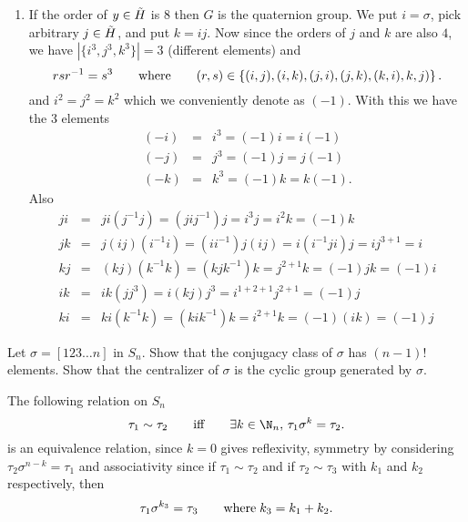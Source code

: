 \documentclass[12pt]{book}
\newcounter{myenumi}
\newenvironment{myenumerate}
{\begin{enumerate}
 \setcounter{enumi}{\themyenumi}
}
{\setcounter{myenumi}{\theenumi}
 \end{enumerate}}
\begin{document}
\begin{myenumerate}
\begin{enumerate}
\item If the order of \(y\in\tilde{H}\) is $8$ then $G$ is the quaternion group.
We put \(i=\sigma\), pick arbitrary \(j\in\tilde{H}\), and put \(k=ij\).
Now since the orders of $j$ and $k$ are also $4$,
we have \(|\{i^3,j^3,k^3\}|=3\) (different elements) and
\begin{equation*}
rsr^{-1}=s^3 \qquad \textnormal{where} \qquad
(r,s) \in \left\{(i,j), (i,k), (j,i), (j, k), (k,i), k,j)\right\}.
\end{equation*}
and \(i^2 = j^2 = k^2\) which we conveniently denote as \((-1)\).
With this we have the 3 elements
\begin{eqnarray*}
(-i) &=& i^{3} = (-1)i = i(-1) \\
(-j) &=& j^{3} = (-1)j = j(-1) \\
(-k) &=& k^{3} = (-1)k = k(-1).
\end{eqnarray*}
Also
\begin{eqnarray*}
ji &=& ji(j^{-1}j) = (jij^{-1})j = i^{3}j = i^2k = (-1)k \\
jk &=& j(ij)(i^{-1}i) = (ii^{-1})j(ij) = i(i^{-1}ji)j = ij^{3+1} = i \\
kj &=& (kj)(k^{-1}k) = (kjk^{-1})k = j^{2+1}k = (-1)jk = (-1)i   \\
ik &=& ik(jj^3) = i(kj)j^3 = i^{1+2+1}j^{2+1} = (-1)j \\
ki &=& ki(k^{-1}k) = (kik^{-1})k = i^{2+1}k = (-1)(ik) = (-1)j
\end{eqnarray*}
\end{enumerate}


\begin{excopy}
Let \(\sigma = [123 \ldots n]\) in \(S_n\).
Show that the conjugacy class of \(\sigma\) has \((n - 1)!\) elements.
Show that the centralizer of \(\sigma\) is the cyclic group generated by
\(\sigma\).
\end{excopy}

The following relation on \(S_n\)
\begin{equation*}
\tau_1 \sim \tau_2 
\qquad \textnormal{iff} \qquad
\exists k\in \N_n,\, \tau_1 \sigma^k = \tau_2.
\end{equation*}
is an equivalence relation, since
\(k=0\) gives reflexivity, symmetry by considering 
\(\tau_2 \sigma^{n-k} = \tau_1\) and associativity
since if \(\tau_1 \sim \tau_2\)
and if \(\tau_2 \sim \tau_3\)
with \(k_1\) and \(k_2\) respectively, then
\begin{equation*}
\tau_1 \sigma^{k_3} = \tau_3
\qquad \textnormal{where}\; k_3 = k_1+k_2.
\end{equation*}


\end{myenumerate}
\end{document}
